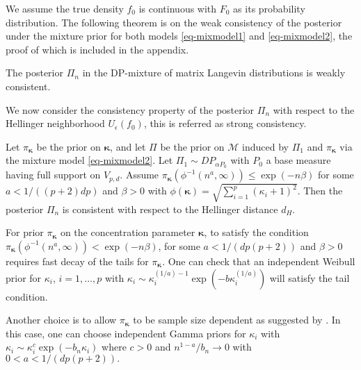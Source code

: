 We assume the  true density $f_0$ is continuous with $F_0$  as its probability distribution. The following theorem is on the weak consistency of the posterior under the mixture prior for both models \eqref{eq-mixmodel1} and  \eqref{eq-mixmodel2}, the proof of which is included in the appendix.
\begin{theorem}
\label{th-weakConsistency}
The posterior $\Pi_{n}$ in the DP-mixture of matrix Langevin distributions is weakly consistent. %
\end{theorem}


We now consider the consistency property of the posterior $\Pi_n$ with respect to the Hellinger neighborhood $U_{\epsilon}(f_0)$, this is referred as strong consistency.
%
\begin{theorem}
\label{th2}
Let $\pi_{\boldsymbol{\kappa}}$ be the prior on $\boldsymbol\kappa$, and
let $\Pi$ be the prior on $\mathcal{M}$ induced by $\Pi_1$ and $\pi_{\boldsymbol{\kappa}}$ via the mixture model \eqref{eq-mixmodel2}.
Let $\Pi_1\sim DP_{\alpha P_0}$ with $P_0$ a base measure having full support on $V_{p,d}$.  Assume $\pi_{\boldsymbol{\kappa}}(\phi^{-1}(n^a,\infty))\leq \exp(-n\beta)$ for some $a<1/((p+2)dp)$ and $\beta>0$ with $\phi(\boldsymbol{\kappa})=\sqrt{\sum_{i=1}^p(\kappa_i+1)^2}$. Then the posterior $\Pi_{n}$ is consistent with respect to the Hellinger distance $d_H$.
\end{theorem}


\begin{remark}
For prior $\pi_{\boldsymbol{\kappa}}$ on the concentration parameter $\boldsymbol{\kappa}$, to satisfy the condition
$\pi_{\boldsymbol{\kappa}}\left( \phi^{-1}(n^a,\infty)  \right)<\exp(-n\beta)$,
for some $a<1/(dp(p+2))$ and $\beta>0$ requires fast decay of the tails for $\pi_{\boldsymbol{\kappa}}$. One can check that an independent Weibull prior for $\kappa_i$, $i=1,\ldots, p$ with 
$\kappa_i\sim \kappa_i^{\left(1/a\right)-1}\exp(-b \kappa_i^{(1/a)})$ will satisfy the tail  condition.

Another choice is to allow $\pi_{\boldsymbol{\kappa}}$ to be sample size dependent as suggested by \cite{abs2}. In this case, one can choose independent Gamma priors for 
$\kappa_i$ with $\kappa_i\sim\kappa_i^{c}\exp(-b_n\kappa_i)$ where $c>0$ and $n^{1-a}/b_n\rightarrow 0$ with $0<a<1/(dp(p+2)).$
\end{remark}

